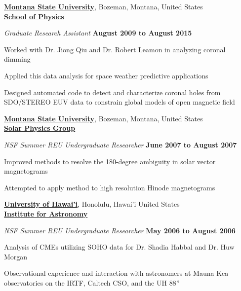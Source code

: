 \documentclass[10pt]{article}
\newenvironment{outerlist}[1][\enskip\textbullet]%
        {\begin{enumerate}[#1]}{\end{enumerate}%
         \vspace{-.6\baselineskip}}
\newenvironment{innerlist}[1][\enskip\textbullet]%
        {\begin{compactenum}[#1]}{\end{compactenum}}
\begin{document}
\href{http://www.montana.edu}{\textbf{Montana State University}}, 
Bozeman, Montana, United States\\
\href{http://www.physics.montana.edu}{\textbf{School of Physics}}
\begin{outerlist}
\item[] \textit{Graduate Research Assistant}%
        \hfill \textbf{August 2009 to August 2015}
\begin{innerlist}
  \item Worked with Dr. Jiong Qiu and Dr. Robert Leamon in analyzing coronal dimming
  \item Applied this data analysis for space weather predictive applications
  \item Designed automated code to detect and characterize coronal holes from SDO/STEREO EUV data to constrain global models of open magnetic field
  \\
\end{innerlist}

\end{outerlist}

\href{http://solar.physics.montana.edu/}{\textbf{Montana State University}}, 
Bozeman, Montana, United States\\
\href{http://solar.physics.montana.edu/}{\textbf{Solar Physics Group}}
\begin{outerlist}
\item[] \textit{NSF Summer REU Undergraduate Researcher}%
        \hfill \textbf{June 2007 to August 2007}
\begin{innerlist}

  \item Improved methods to resolve the 180-degree ambiguity in solar vector \mbox{magnetograms}
  \item Attempted to apply method to high resolution Hinode magnetograms
  \\
\end{innerlist}

\end{outerlist}


\href{http://www.ifa.hawaii.edu/}{\textbf{University of Hawai'i}}, 
Honolulu, Hawai'i United States\\
\href{http://www.ifa.hawaii.edu/}{\textbf{Institute for Astronomy}}
\begin{outerlist}
\item[] \textit{NSF Summer REU Undergraduate Researcher}%
        \hfill \textbf{May 2006 to August 2006}
\begin{innerlist}
  \item Analysis of CMEs utilizing SOHO data for Dr. Shadia Habbal and Dr. Huw Morgan
  \item Observational experience and interaction with astronomers at Mauna Kea \mbox{observatories} on the IRTF, Caltech CSO, and the UH 88'' \\
\end{innerlist}

\end{outerlist}
\end{document}
